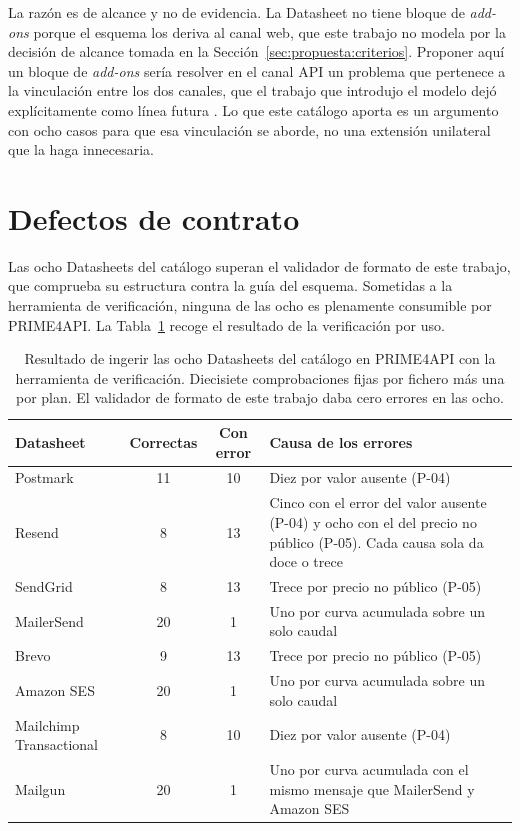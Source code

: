 La razón es de alcance y no de evidencia. La Datasheet no tiene bloque de
\textit{add-ons} porque el esquema los deriva al canal web, que este trabajo no
modela por la decisión de alcance tomada en la Sección~\ref{sec:propuesta:criterios}.
Proponer aquí un bloque de \textit{add-ons} sería resolver en el canal API un
problema que pertenece a la vinculación entre los dos canales, que el trabajo que
introdujo el modelo dejó explícitamente como línea futura \citep{gavira2026tfm}.
Lo que este catálogo aporta es un argumento con ocho casos para que esa vinculación se aborde, no una extensión unilateral que la haga innecesaria.

\section{Defectos de contrato}
\label{sec:evolucion:contrato}

Las ocho Datasheets del catálogo superan el validador de formato de este trabajo, que comprueba su estructura contra la guía del esquema.
Sometidas a la herramienta de verificación, ninguna de las ocho es plenamente consumible por PRIME4API.
La Tabla~\ref{tab:verificacion} recoge el resultado de la verificación por uso.

\begin{table}[H]
\centering
\begin{tabular}{|l|c|c|p{5.2cm}|}
\hline
\textbf{Datasheet} & \textbf{Correctas} & \textbf{Con error} & \textbf{Causa de los errores} \\
\hline
Postmark & 11 & 10 & Diez por valor ausente (P-04) \\
\hline
Resend & 8 & 13 & Cinco con el error del valor ausente (P-04) y ocho con el del precio no público (P-05). Cada causa sola da doce o trece \\
\hline
SendGrid & 8 & 13 & Trece por precio no público (P-05) \\
\hline
MailerSend & 20 & 1 & Uno por curva acumulada sobre un solo caudal \\
\hline
Brevo & 9 & 13 & Trece por precio no público (P-05) \\
\hline
Amazon SES & 20 & 1 & Uno por curva acumulada sobre un solo caudal \\
\hline
Mailchimp Transactional & 8 & 10 & Diez por valor ausente (P-04) \\
\hline
Mailgun & 20 & 1 & Uno por curva acumulada con el mismo mensaje que MailerSend y Amazon SES \\
\hline
\end{tabular}
\caption{Resultado de ingerir las ocho Datasheets del catálogo en PRIME4API con la herramienta de verificación. Diecisiete comprobaciones fijas por fichero más una por plan. El validador de formato de este trabajo daba cero errores en las ocho.}
\label{tab:verificacion}
\end{table}


